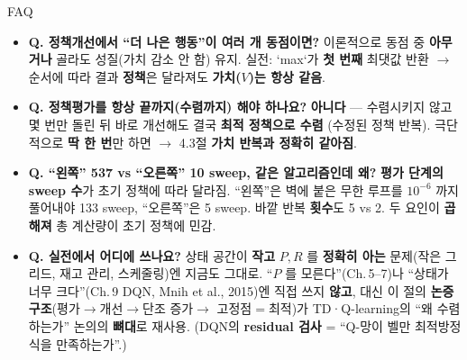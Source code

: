 \documentclass[aspectratio=169,11pt]{beamer}
\begin{document}
\begin{frame}{FAQ}
  \begin{itemize}
    \item \textbf{Q. 정책개선에서 ``더 나은 행동''이 여러 개
      동점이면?} 이론적으로 동점 중 \textbf{아무거나} 골라도
      성질(가치 감소 안 함) 유지. 실전: `max`가 \textbf{첫
      번째} 최댓값 반환 $\to$ 순서에 따라 결과 \textbf{정책}은
      달라져도 \textbf{가치($V$)는 항상 같음}.
    \item \textbf{Q. 정책평가를 항상 끝까지(수렴까지) 해야
      하나요?} \textbf{아니다} --- 수렴시키지 않고 몇 번만
      돌린 뒤 바로 개선해도 결국 \textbf{최적 정책으로 수렴}
      (수정된 정책 반복). 극단적으로 \textbf{딱 한 번}만 하면
      $\to$ 4.3절 \textbf{가치 반복과 정확히 같아짐}.
    \item \textbf{Q. ``왼쪽'' 537 vs ``오른쪽'' 10 sweep,
      같은 알고리즘인데 왜?} \textbf{평가 단계의 sweep 수}가
      초기 정책에 따라 달라짐. ``왼쪽''은 벽에 붙은 무한 루프를
      $10^{-6}$ 까지 풀어내야 133 sweep, ``오른쪽''은 5 sweep.
      바깥 반복 \textbf{횟수}도 5 vs 2. 두 요인이 \textbf{곱해져}
      총 계산량이 초기 정책에 민감.
    \item \textbf{Q. 실전에서 어디에 쓰나요?} 상태 공간이
      \textbf{작고} $P, R$ 를 \textbf{정확히 아는} 문제(작은
      그리드, 재고 관리, 스케줄링)엔 지금도 그대로. ``$P$ 를
      모른다''(Ch.\,5--7)나 ``상태가 너무 크다''(Ch.\,9 DQN,
      Mnih et al., 2015)엔 직접 쓰지 \textbf{않고}, 대신 이 절의
      \textbf{논증 구조}(평가$\to$개선$\to$단조 증가$\to$
      고정점$=$최적)가 TD·Q-learning의 ``왜 수렴하는가''
      논의의 \textbf{뼈대}로 재사용. (DQN의 \textbf{residual
      검사} = ``Q-망이 벨만 최적방정식을 만족하는가''.)
  \end{itemize}
\end{frame}
\end{document}
